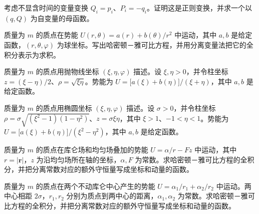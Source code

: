 \newpage
\noindent\begin{minipage}{\textwidth}
考虑不显含时间的变量变换 $Q_i=p_i$、$P_i=-q_i$。证明这是正则变换，并求一个以 $(q,Q)$ 为自变量的母函数。
\end{minipage}\par\vfill
\noindent\begin{minipage}{\textwidth}
质量为 $m$ 的质点在势能 $U(r,\theta)=a(r)+b(\theta)/r^2$ 中运动，其中 $a,b$ 是给定函数，$(r,\theta,\varphi)$ 为球坐标。写出哈密顿－雅可比方程，并用分离变量法把它的全积分表示为求积。
\end{minipage}\par\vfill
\newpage
\noindent\begin{minipage}{\textwidth}
质量为 $m$ 的质点用抛物线坐标 $(\xi,\eta,\varphi)$ 描述。设 $\xi,\eta>0$，并令柱坐标 $z=(\xi-\eta)/2$、$\rho=\sqrt{\xi\eta}$。势能为 $U=\bigl[a(\xi)+b(\eta)\bigr]/(\xi+\eta)$，其中 $a,b$ 是给定函数。
\end{minipage}\par\vfill
\noindent\begin{minipage}{\textwidth}
质量为 $m$ 的质点用椭圆坐标 $(\xi,\eta,\varphi)$ 描述。设 $\sigma>0$，并令柱坐标 $\rho=\sigma\sqrt{(\xi^2-1)(1-\eta^2)}$、$z=\sigma\xi\eta$，其中 $\xi>1$、$-1<\eta<1$。势能为 $U=\bigl[a(\xi)+b(\eta)\bigr]/(\xi^2-\eta^2)$，其中 $a,b$ 是给定函数。
\end{minipage}\par\vfill
\newpage
\noindent\begin{minipage}{\textwidth}
质量为 $m$ 的质点在库仑场和均匀场叠加的势能 $U=\alpha/r-Fz$ 中运动，其中 $r=|\mathbf r|$，$z$ 为沿均匀场所在轴的坐标，$\alpha,F$ 为常数。求哈密顿－雅可比方程的全积分，并把分离常数对应的额外守恒量写成坐标和动量的函数。
\end{minipage}\par\vfill
\noindent\begin{minipage}{\textwidth}
质量为 $m$ 的质点在两个不动库仑中心产生的势能 $U=\alpha_1/r_1+\alpha_2/r_2$ 中运动。两中心相距 $2\sigma$，$r_1,r_2$ 分别为质点到两中心的距离，$\alpha_1,\alpha_2$ 为常数。求哈密顿－雅可比方程的全积分，并把分离常数对应的额外守恒量写成坐标和动量的函数。
\end{minipage}\par\vfill
